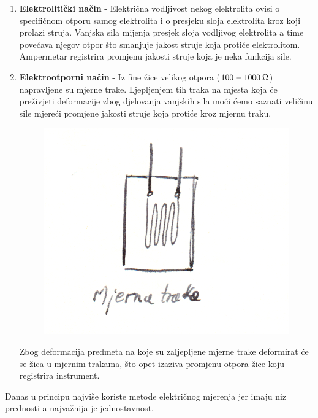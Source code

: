\documentclass[a4paper,12pt]{article}
\numberwithin{figure}{section}
\begin{document}
\begin{enumerate}
\begin{figure}[!h]
\end{figure}
\FloatBarrier
\item \textbf{Elektrolitički način} - Električna vodljivost nekog elektrolita ovisi o specifičnom otporu samog elektrolita i o presjeku sloja elektrolita kroz koji prolazi struja. Vanjska sila mijenja presjek sloja vodljivog elektrolita a time povećava njegov otpor što smanjuje jakost struje koja protiće elektrolitom. Ampermetar registrira promjenu jakosti struje koja je neka funkcija sile.
\item \textbf{Elektrootporni način} - Iz fine žice velikog otpora ($100 - 1000\:\ohm$) napravljene su mjerne trake. Ljepljenjem tih traka na mjesta koja će preživjeti deformacije zbog djelovanja vanjskih sila moći ćemo saznati veličinu sile mjereći promjene jakosti struje koja protiće kroz mjernu traku.
\begin{figure}[!h]
\includegraphics[scale=0.2]{image_10-2.png}
\end{figure}
\FloatBarrier
Zbog deformacija predmeta na koje su zaljepljene mjerne trake deformirat će se žica u mjernim trakama, što opet izaziva promjenu otpora žice koju registrira instrument. 
\end{enumerate}
Danas u principu najviše koriste metode električnog mjerenja jer imaju niz  prednosti a najvažnija je jednostavnost.
\end{document}
